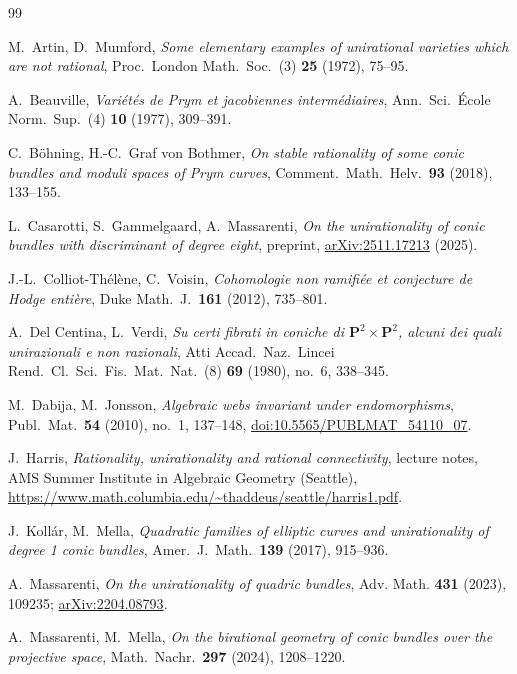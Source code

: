 \documentclass[11pt]{amsart}
\theoremstyle{definition}
\theoremstyle{remark}
\newcommand{\PP}{\mathbf{P}}
\begin{document}
\begin{thebibliography}{99}

M.~Artin, D.~Mumford,
\emph{Some elementary examples of unirational varieties which are not
rational}, Proc.\ London Math.\ Soc.\ (3) \textbf{25} (1972), 75--95.

A.~Beauville,
\emph{Vari\'et\'es de Prym et jacobiennes interm\'ediaires},
Ann.\ Sci.\ \'Ecole Norm.\ Sup.\ (4) \textbf{10} (1977), 309--391.

C.~B\"ohning, H.-C.~Graf von Bothmer,
\emph{On stable rationality of some conic bundles and moduli spaces of
Prym curves}, Comment.\ Math.\ Helv.\ \textbf{93} (2018), 133--155.

L.~Casarotti, S.~Gammelgaard, A.~Massarenti,
\emph{On the unirationality of conic bundles with discriminant of degree
eight}, preprint, \href{https://arxiv.org/abs/2511.17213}{arXiv:2511.17213}
(2025).

J.-L.~Colliot-Th\'el\`ene, C.~Voisin,
\emph{Cohomologie non ramifi\'ee et conjecture de Hodge enti\`ere},
Duke Math.\ J.\ \textbf{161} (2012), 735--801.

A.~Del Centina, L.~Verdi,
\emph{Su certi fibrati in coniche di $\PP^2\times\PP^2$, alcuni dei quali
unirazionali e non razionali},
Atti Accad.\ Naz.\ Lincei Rend.\ Cl.\ Sci.\ Fis.\ Mat.\ Nat.\ (8)
\textbf{69} (1980), no.~6, 338--345.

M.~Dabija, M.~Jonsson,
\emph{Algebraic webs invariant under endomorphisms},
Publ.\ Mat.\ \textbf{54} (2010), no.~1, 137--148,
\href{https://doi.org/10.5565/PUBLMAT_54110_07}{doi:10.5565/PUBLMAT\_54110\_07}.

J.~Harris,
\emph{Rationality, unirationality and rational connectivity},
lecture notes, AMS Summer Institute in Algebraic Geometry (Seattle),
\url{https://www.math.columbia.edu/~thaddeus/seattle/harris1.pdf}.

J.~Koll\'ar, M.~Mella,
\emph{Quadratic families of elliptic curves and unirationality of degree
1 conic bundles}, Amer.\ J.\ Math.\ \textbf{139} (2017), 915--936.

A.~Massarenti,
\emph{On the unirationality of quadric bundles},
Adv. Math. \textbf{431} (2023), 109235;
\href{https://arxiv.org/abs/2204.08793}{arXiv:2204.08793}.

A.~Massarenti, M.~Mella,
\emph{On the birational geometry of conic bundles over the projective
space}, Math.\ Nachr.\ \textbf{297} (2024), 1208--1220.


\end{thebibliography}
\end{document}
